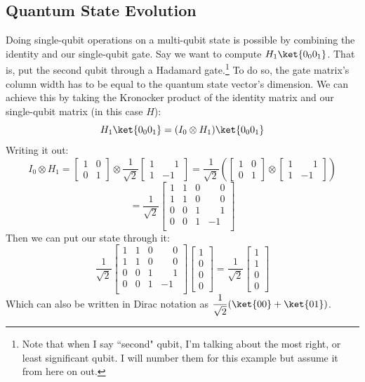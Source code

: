 \documentclass[11pt]{article}
\newcommand{\igate}{
  \begin{bmatrix}
  1 & 0 \\
  0 & 1 
  \end{bmatrix}
}
\newcommand{\hgate}{
  \dfrac{1}{\sqrt2}
  \begin{bmatrix}
  1 & \phantom{-}1 \\
  1 & -1
  \end{bmatrix}
}
\begin{document}
\subsection{Quantum State Evolution}
Doing single-qubit operations on a multi-qubit state is possible by combining the identity and our single-qubit gate. Say we want to compute $H_1\ket{0_0 0_1}$. That is, put the second qubit through a Hadamard gate.\footnote{Note that when I say ``second" qubit, I'm talking about the most right, or least significant qubit. I will number them for this example but assume it from here on out.} To do so, the gate matrix's column width has to be equal to the quantum state vector's dimension. We can achieve this by taking the Kronocker product of the identity matrix and our single-qubit matrix (in this case $H$):
\[
  H_1\ket{0_0 0_1} = (I_0 \otimes H_1)\ket{0_0 0_1}
\]
Writing it out:
\[
I_0 \otimes H_1 = 
  \igate{} \otimes \hgate{}
  =
  \dfrac{1}{\sqrt2}
  \left(
  \igate{}
  \otimes
  \begin{bmatrix}
  1 & \phantom{-}1 \\
  1 & -1
  \end{bmatrix}
  \right)
\]
\[
= \dfrac{1}{\sqrt2}
  \begin{bmatrix}
  1 & 1 & 0 & \phantom{-}0 \\
  1 & 1 & 0 & \phantom{-}0 \\
  0 & 0 & 1 & \phantom{-}1 \\
  0 & 0 & 1 & -1 \\
  \end{bmatrix}
\]
Then we can put our  state through it:
\[
  \dfrac{1}{\sqrt2}
  \begin{bmatrix}
  1 & 1 & 0 & \phantom{-}0 \\
  1 & 1 & 0 & \phantom{-}0 \\
  0 & 0 & 1 & \phantom{-}1 \\
  0 & 0 & 1 & -1 \\
  \end{bmatrix}
  \begin{bmatrix}
  1 \\
  0 \\
  0 \\
  0
  \end{bmatrix}
  =
  \dfrac{1}{\sqrt2}
  \begin{bmatrix}
  1 \\
  1 \\
  0 \\
  0
  \end{bmatrix}
\]
Which can also be written in Dirac notation as $\dfrac{1}{\sqrt2}(\ket{00} + \ket{01})$.
\end{document}
